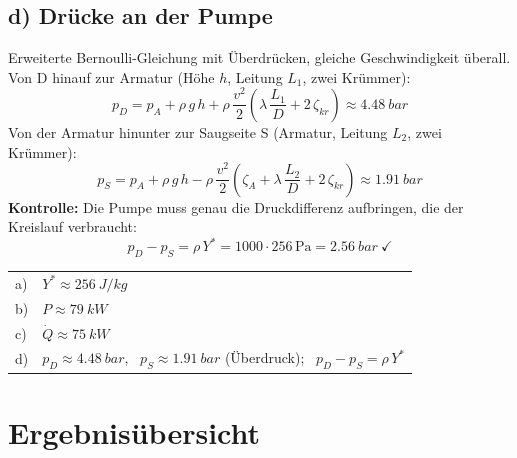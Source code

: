 \documentclass[11pt,a4paper]{article}
\begin{document}
\subsection*{d) Drücke an der Pumpe}

Erweiterte Bernoulli-Gleichung mit Überdrücken, gleiche Geschwindigkeit überall. Von D hinauf zur Armatur (Höhe $h$, Leitung $L_1$, zwei Krümmer):
\[
p_D = p_A + \rho\,g\,h + \rho\,\frac{v^2}{2}\left(\lambda\,\frac{L_1}{D} + 2\,\zeta_{kr}\right) \approx \SI{4.48}{bar}
\]
Von der Armatur hinunter zur Saugseite S (Armatur, Leitung $L_2$, zwei Krümmer):
\[
p_S = p_A + \rho\,g\,h - \rho\,\frac{v^2}{2}\left(\zeta_A + \lambda\,\frac{L_2}{D} + 2\,\zeta_{kr}\right) \approx \SI{1.91}{bar}
\]
\textbf{Kontrolle:} Die Pumpe muss genau die Druckdifferenz aufbringen, die der Kreislauf verbraucht:
\[
p_D - p_S = \rho\,Y^* = 1000\cdot 256\,\mathrm{Pa} = \SI{2.56}{bar} \ \checkmark
\]

\begin{ergebnis}
\begin{tabular}{@{}ll@{}}
a) & $Y^* \approx \SI{256}{J/kg}$ \\
b) & $P \approx \SI{79}{kW}$ \\
c) & $\dot Q \approx \SI{75}{kW}$ \\
d) & $p_D \approx \SI{4.48}{bar}$, \ $p_S \approx \SI{1.91}{bar}$ (Überdruck); \ $p_D - p_S = \rho\,Y^*$
\end{tabular}
\end{ergebnis}

\section{Ergebnisübersicht}
\end{document}
